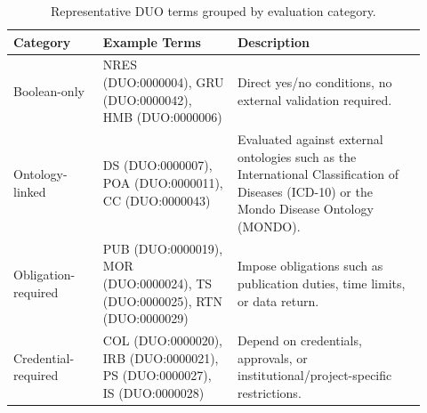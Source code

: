 \begin{table}[htbp]
	\centering
	\caption{Representative DUO terms grouped by evaluation category.}
	\label{tab:duo-categories}
	\begin{tabular}{@{}>{\raggedright\arraybackslash}p{0.20\linewidth}>{\raggedright\arraybackslash}p{0.30\linewidth}>{\raggedright\arraybackslash}p{0.42\linewidth}@{}}
		\toprule
		\textbf{Category}                                                         & \textbf{Example Terms} & \textbf{Description}                  \\
		\midrule
		Boolean-only                                                              &
		NRES (DUO:0000004), GRU (DUO:0000042), HMB (DUO:0000006)                  &
		Direct yes/no conditions, no external validation required.                                                                                 \\
		\addlinespace
		Ontology-linked                                                           &
		DS (DUO:0000007), POA (DUO:0000011), CC (DUO:0000043)                     &
		Evaluated against external ontologies such as the International Classification of Diseases (ICD-10) or the Mondo Disease Ontology (MONDO). \\
		\addlinespace
		Obligation-required                                                       &
		PUB (DUO:0000019), MOR (DUO:0000024), TS (DUO:0000025), RTN (DUO:0000029) &
		Impose obligations such as publication duties, time limits, or data return.                                                                \\
		\addlinespace
		Credential-required                                                       &
		COL (DUO:0000020), IRB (DUO:0000021), PS (DUO:0000027), IS (DUO:0000028)  &
		Depend on credentials, approvals, or institutional/project-specific restrictions.                                                          \\
		\bottomrule
	\end{tabular}
\end{table}

